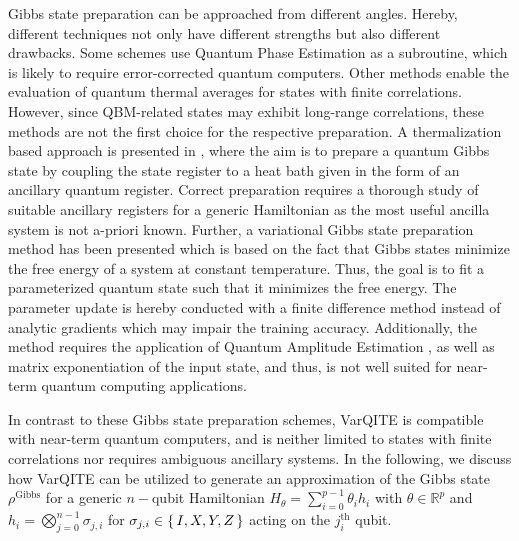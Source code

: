 \documentclass[twocolumn, aps, pra, superscriptaddress, floatfix]{revtex4}
\begin{document}
Gibbs state preparation can be approached from different angles. Hereby, different techniques not only have different strengths but also different drawbacks. 
Some schemes \cite{Temme2011QuantumMS, YungQuantumMetropolis12, PoulinThermalQGibbs09} use Quantum Phase Estimation \cite{AbramsQPE99} as a subroutine, which is likely to require error-corrected quantum computers. 
Other methods enable the evaluation of quantum thermal averages \cite{MottaQITE20, brandaoFiniteCorrLengthEfficientPrep19, BrandaoGibbsSampler16} for states with finite correlations. However, since QBM-related states may exhibit long-range correlations, these methods are not the first choice for the respective preparation.
A thermalization based approach is presented in \cite{Anschtz2019RealizingQB}, where the aim is to prepare a quantum Gibbs state by coupling the state register to a heat bath given in the form of an ancillary quantum register. 
Correct preparation requires a thorough study of suitable ancillary registers for a generic Hamiltonian as the most useful ancilla system is not a-priori known.
Further, a variational Gibbs state preparation method has been presented \cite{WiebeVariationalGibbs2020} which is based on the fact that Gibbs states minimize the free energy of a system at constant temperature.
Thus, the goal is to fit a parameterized quantum state such that it minimizes the free energy. 
The parameter update is hereby conducted with a finite difference method instead of analytic gradients which may impair the training accuracy. Additionally, the method requires the application of Quantum Amplitude Estimation \cite{brassardQAE02}, as well as matrix exponentiation of the input state, and thus, is not well suited for near-term quantum computing applications.

In contrast to these Gibbs state preparation schemes, VarQITE is compatible with near-term quantum computers, and is neither limited to states with finite correlations nor requires ambiguous ancillary systems.
In the following, we discuss how VarQITE can be utilized to generate an approximation of the Gibbs state $\rho^{\text{Gibbs}}$ for a generic $n-$qubit Hamiltonian $H_{\theta}=\sum_{i=0}^{p-1}\theta_ih_i $ with $\theta\in\mathbb{R}^p$ and $h_i=\bigotimes_{j=0}^{n-1}\sigma_{j, i}$ for $\sigma_{j, i}\in\set{I, X, Y, Z}$ acting on the $j_i^{\text{th}}$ qubit.
\end{document}
